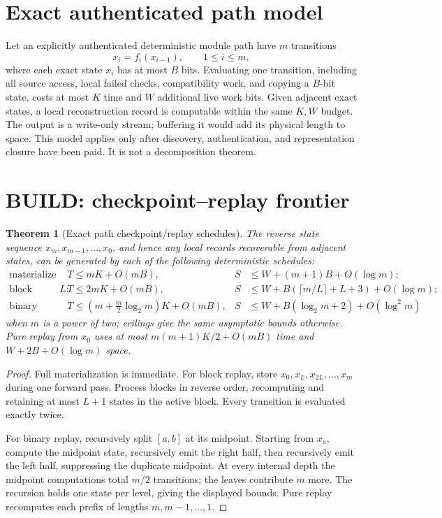 \documentclass[11pt]{article}
\newtheorem{theorem}{Theorem}
\begin{document}
\section{Exact authenticated path model}

Let an explicitly authenticated deterministic module path have $m$ transitions
\[
 x_i=f_i(x_{i-1}),\qquad 1\le i\le m,
\]
where each exact state $x_i$ has at most $B$ bits.  Evaluating one transition, including all source
access, local failed checks, compatibility work, and copying a $B$-bit state, costs at most $K$ time
and $W$ additional live work bits.  Given adjacent exact states, a local reconstruction record is
computable within the same $K,W$ budget.  The output is a write-only stream; buffering it would add
its physical length to space.  This model applies only after discovery, authentication, and
representation closure have been paid.  It is not a decomposition theorem.

\section{BUILD: checkpoint--replay frontier}

\begin{theorem}[Exact path checkpoint/replay schedules]
\label{thm:replay}
The reverse state sequence $x_m,x_{m-1},\ldots,x_0$, and hence any local records recoverable from
adjacent states, can be generated by each of the following deterministic schedules:
\begin{align*}
\text{materialize all: }&T\le mK+O(mB),&
S&\le W+(m+1)B+O(\log m);\\
\text{block length }L: &T\le2mK+O(mB),&
S&\le W+B(\lceil m/L\rceil+L+3)+O(\log m);\\
\text{binary replay: }&T\le\left(m+\frac m2\log_2m\right)K+O(mB),&
S&\le W+B(\log_2m+2)+O(\log^2m)
\end{align*}
when $m$ is a power of two; ceilings give the same asymptotic bounds otherwise.  Pure replay from
$x_0$ uses at most $m(m+1)K/2+O(mB)$ time and $W+2B+O(\log m)$ space.
\end{theorem}

\begin{proof}
Full materialization is immediate.  For block replay, store $x_0,x_L,x_{2L},\ldots,x_m$ during one
forward pass.  Process blocks in reverse order, recomputing and retaining at most $L+1$ states in the
active block.  Every transition is evaluated exactly twice.

For binary replay, recursively split $[a,b]$ at its midpoint.  Starting from $x_a$, compute the
midpoint state, recursively emit the right half, then recursively emit the left half, suppressing the
duplicate midpoint.  At every internal depth the midpoint computations total $m/2$ transitions; the
leaves contribute $m$ more.  The recursion holds one state per level, giving the displayed bounds.
Pure replay recomputes each prefix of lengths $m,m-1,\ldots,1$.
\end{proof}
\end{document}
